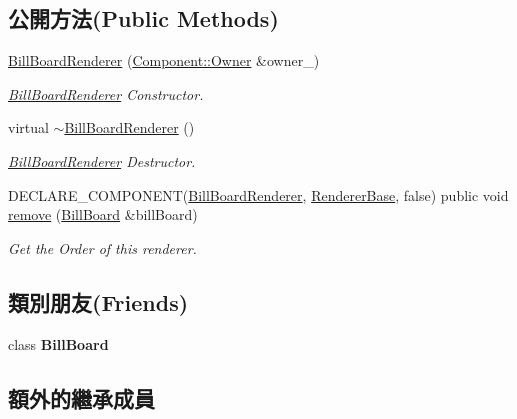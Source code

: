 \subsection*{公開方法(Public Methods)}
\begin{DoxyCompactItemize}
\item 
\hyperlink{class_magnum_1_1_bill_board_renderer_afb0b058c05103a7c459eac5b8ab66acf}{Bill\+Board\+Renderer} (\hyperlink{class_magnum_1_1_component_1_1_owner}{Component\+::\+Owner} \&owner\+\_\+)
\begin{DoxyCompactList}\small\item\em \hyperlink{class_magnum_1_1_bill_board_renderer}{Bill\+Board\+Renderer} Constructor. \end{DoxyCompactList}\item 
virtual \hyperlink{class_magnum_1_1_bill_board_renderer_a768f1b1a80b526eb3f9245c04ad95ca5}{$\sim$\+Bill\+Board\+Renderer} ()
\begin{DoxyCompactList}\small\item\em \hyperlink{class_magnum_1_1_bill_board_renderer}{Bill\+Board\+Renderer} Destructor. \end{DoxyCompactList}\item 
D\+E\+C\+L\+A\+R\+E\+\_\+\+C\+O\+M\+P\+O\+N\+E\+NT(\hyperlink{class_magnum_1_1_bill_board_renderer}{Bill\+Board\+Renderer}, \hyperlink{class_magnum_1_1_renderer_base}{Renderer\+Base}, false) public void \hyperlink{class_magnum_1_1_bill_board_renderer_a551846a61bfad0c3104bd75136e37a7e}{remove} (\hyperlink{class_magnum_1_1_bill_board}{Bill\+Board} \&bill\+Board)
\begin{DoxyCompactList}\small\item\em Get the Order of this renderer. \end{DoxyCompactList}\end{DoxyCompactItemize}
\subsection*{類別朋友(Friends)}
\begin{DoxyCompactItemize}
\item 
class {\bfseries Bill\+Board}\hypertarget{class_magnum_1_1_bill_board_renderer_ad9aa2431ce029b30aa574a2a460221c0}{}\label{class_magnum_1_1_bill_board_renderer_ad9aa2431ce029b30aa574a2a460221c0}

\end{DoxyCompactItemize}
\subsection*{額外的繼承成員}


